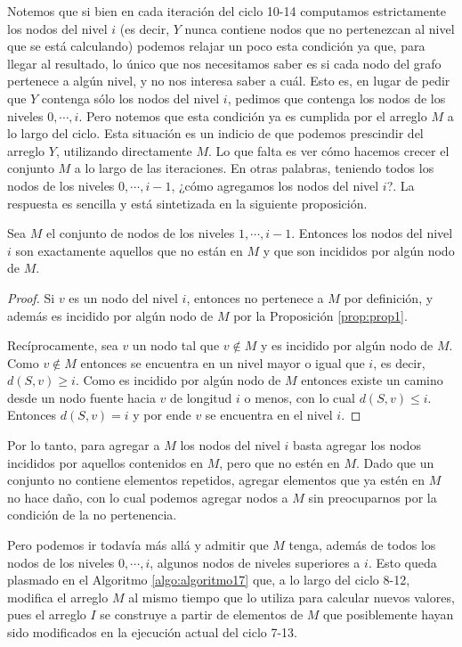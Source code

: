 Notemos que si bien en cada iteración del ciclo 10-14 computamos estrictamente los nodos del nivel $i$ (es decir, $Y$ nunca contiene nodos que no pertenezcan al nivel que se está calculando) podemos relajar un poco esta condición ya que, para llegar al resultado, lo único que nos necesitamos saber es si cada nodo del grafo pertenece a algún nivel, y no nos interesa saber a cuál. Esto es, en lugar de pedir que $Y$ contenga sólo los nodos del nivel $i$, pedimos que contenga los nodos de los niveles $0, \cdots, i$. Pero notemos que esta condición ya es cumplida por el arreglo $M$ a lo largo del ciclo. Esta situación es un indicio de que podemos prescindir del arreglo $Y$, utilizando directamente $M$. Lo que falta es ver cómo hacemos crecer el conjunto $M$ a lo largo de las iteraciones. En otras palabras, teniendo todos los nodos de los niveles $0, \cdots, i - 1$, ¿cómo agregamos los nodos del nivel $i$?. La respuesta es sencilla y está sintetizada en la siguiente proposición.

\begin{prop}
\label{prop:prop3}
Sea $M$ el conjunto de nodos de los niveles $1, \cdots, i - 1$. Entonces los nodos del nivel $i$ son exactamente aquellos que no están en $M$ y que son incididos por algún nodo de $M$.

\begin{proof}
Si $v$ es un nodo del nivel $i$, entonces no pertenece a $M$ por definición, y además es incidido por algún nodo de $M$ por la Proposición \ref{prop:prop1}.

Recíprocamente, sea $v$ un nodo tal que $v \notin M$ y es incidido por algún nodo de $M$. Como $v \notin M$ entonces se encuentra en un nivel mayor o igual que $i$, es decir, $d(S, v) \geq i$. Como es incidido por algún nodo de $M$ entonces existe un camino desde un nodo fuente hacia $v$ de longitud $i$ o menos, con lo cual $d(S, v) \leq i$. Entonces $d(S, v) = i$ y por ende $v$ se encuentra en el nivel $i$.
\end{proof}
\end{prop}

Por lo tanto, para agregar a $M$ los nodos del nivel $i$ basta agregar los nodos incididos por aquellos contenidos en $M$, pero que no estén en $M$. Dado que un conjunto no contiene elementos repetidos, agregar elementos que ya estén en $M$ no hace daño, con lo cual podemos agregar nodos a $M$ sin preocuparnos por la condición de la no pertenencia.

Pero podemos ir todavía más allá y admitir que $M$ tenga, además de todos los nodos de los niveles $0, \cdots, i$, algunos nodos de niveles superiores a $i$. Esto queda plasmado en el Algoritmo \ref{algo:algoritmo17} que, a lo largo del ciclo 8-12, modifica el arreglo $M$ al mismo tiempo que lo utiliza para calcular nuevos valores, pues el arreglo $I$ se construye a partir de elementos de $M$ que posiblemente hayan sido modificados en la ejecución actual del ciclo 7-13.

